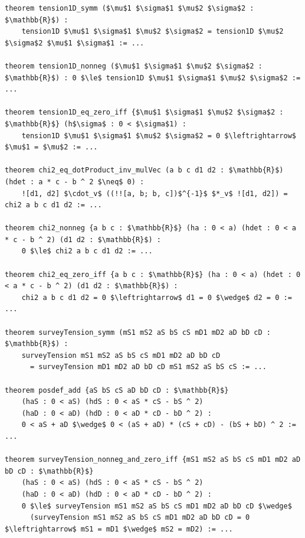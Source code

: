 \begin{lstlisting}[mathescape]
theorem tension1D_symm ($\mu$1 $\sigma$1 $\mu$2 $\sigma$2 : $\mathbb{R}$) :
    tension1D $\mu$1 $\sigma$1 $\mu$2 $\sigma$2 = tension1D $\mu$2 $\sigma$2 $\mu$1 $\sigma$1 := ...

theorem tension1D_nonneg ($\mu$1 $\sigma$1 $\mu$2 $\sigma$2 : $\mathbb{R}$) : 0 $\le$ tension1D $\mu$1 $\sigma$1 $\mu$2 $\sigma$2 := ...

theorem tension1D_eq_zero_iff {$\mu$1 $\sigma$1 $\mu$2 $\sigma$2 : $\mathbb{R}$} (h$\sigma$ : 0 < $\sigma$1) :
    tension1D $\mu$1 $\sigma$1 $\mu$2 $\sigma$2 = 0 $\leftrightarrow$ $\mu$1 = $\mu$2 := ...

theorem chi2_eq_dotProduct_inv_mulVec (a b c d1 d2 : $\mathbb{R}$) (hdet : a * c - b ^ 2 $\neq$ 0) :
    ![d1, d2] $\cdot_v$ ((!![a, b; b, c])$^{-1}$ $*_v$ ![d1, d2]) = chi2 a b c d1 d2 := ...

theorem chi2_nonneg {a b c : $\mathbb{R}$} (ha : 0 < a) (hdet : 0 < a * c - b ^ 2) (d1 d2 : $\mathbb{R}$) :
    0 $\le$ chi2 a b c d1 d2 := ...

theorem chi2_eq_zero_iff {a b c : $\mathbb{R}$} (ha : 0 < a) (hdet : 0 < a * c - b ^ 2) (d1 d2 : $\mathbb{R}$) :
    chi2 a b c d1 d2 = 0 $\leftrightarrow$ d1 = 0 $\wedge$ d2 = 0 := ...

theorem surveyTension_symm (mS1 mS2 aS bS cS mD1 mD2 aD bD cD : $\mathbb{R}$) :
    surveyTension mS1 mS2 aS bS cS mD1 mD2 aD bD cD
      = surveyTension mD1 mD2 aD bD cD mS1 mS2 aS bS cS := ...

theorem posdef_add {aS bS cS aD bD cD : $\mathbb{R}$}
    (haS : 0 < aS) (hdS : 0 < aS * cS - bS ^ 2)
    (haD : 0 < aD) (hdD : 0 < aD * cD - bD ^ 2) :
    0 < aS + aD $\wedge$ 0 < (aS + aD) * (cS + cD) - (bS + bD) ^ 2 := ...

theorem surveyTension_nonneg_and_zero_iff {mS1 mS2 aS bS cS mD1 mD2 aD bD cD : $\mathbb{R}$}
    (haS : 0 < aS) (hdS : 0 < aS * cS - bS ^ 2)
    (haD : 0 < aD) (hdD : 0 < aD * cD - bD ^ 2) :
    0 $\le$ surveyTension mS1 mS2 aS bS cS mD1 mD2 aD bD cD $\wedge$
      (surveyTension mS1 mS2 aS bS cS mD1 mD2 aD bD cD = 0 $\leftrightarrow$ mS1 = mD1 $\wedge$ mS2 = mD2) := ...
\end{lstlisting}
